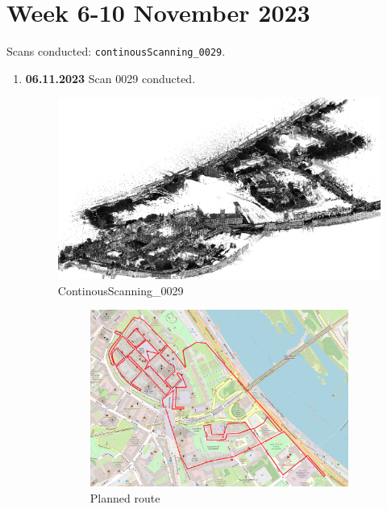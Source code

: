 \documentclass[a4paper,12pt]{book}
\begin{document}
\section{Week 6-10 November 2023}
Scans conducted: \verb|continousScanning_0029|.\\
\begin{enumerate}
	\item \textbf{06.11.2023} Scan 0029 conducted.
	\begin{figure}[H]
		\includegraphics[width=1\linewidth]{cloud29}
		\caption{ContinousScanning\_0029}
	\end{figure}
	\begin{figure}[H]
		\centering
		\begin{subfigure}{.95\textwidth}
			\centering
			\includegraphics[width=1\linewidth]{route_p29}
			\caption{Planned route}
			\label{fig:a29}
		\end{subfigure}%
		\linebreak
		\begin{subfigure}{.95\textwidth}

\end{subfigure}
\end{figure}
\end{enumerate}
\end{document}
